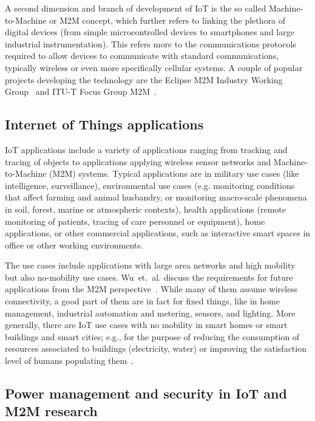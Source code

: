 \documentclass{siamltex}
\begin{document}
A second dimension and branch of development of IoT is the so called
Machine-to-Machine or M2M concept, which further refers to linking the
plethora of digital devices (from
simple microcontrolled devices to smartphones and large industrial
instrumentation). This refers more to the communications protocols required to
allow devices to communicate with standard communications, typically wireless or
even more specifically cellular systems. A couple of popular projects developing
the technology are the Eclipse M2M Industry Working Group~\cite{EclipseM2M} and
ITU-T Focus Group M2M~\cite{ITU-T_FG_M2M}.

\subsection{Internet of Things applications}
\label{ssec:applications}

IoT applications include a variety of applications
ranging from tracking and tracing of objects to
applications applying wireless sensor networks and Machine-to-Machine
(M2M) systems. Typical applications are in military use cases (like
intelligence, surveillance), environmental use cases (e.g. monitoring
conditions that affect farming and animal husbandry, or monitoring
macro-scale phenomena in soil, forest, marine or atmospheric
contexts), health applications (remote monitoring of patients, tracing
of care personnel or equipment), home applications, or other
commercial applications, such as interactive smart spaces in office or
other working environments.

The use cases include applications with large area networks and high
mobility but also no-mobility use cases. Wu~et.~al. discuss the
requirements for future applications from the M2M
perspective~\cite{wu2011m2m}. While many of them assume wireless
connectivity, a good part of them are in fact for fixed things, like
in home management, industrial automation and metering, sensors, and
lighting. More generally, there are IoT use cases with no mobility in
smart homes or smart buildings and smart cities; e.g., for the purpose
of reducing the consumption of resources associated to buildings
(electricity, water) or improving the satisfaction level of humans
populating them~\cite{miorandi2012internet}.

\subsection{Power management and security in IoT and M2M research}
\label{ssec:powersec}
\end{document}
